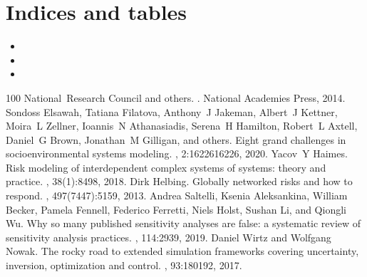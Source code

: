 \documentclass[letterpaper,10pt,english]{sphinxmanual}
\begin{document}
\chapter{Indices and tables}
\label{\detokenize{index:indices-and-tables}}\begin{itemize}
\item {} 
\sphinxAtStartPar
{}

\item {} 
\sphinxAtStartPar
{}

\item {} 
\sphinxAtStartPar
{}

\end{itemize}

\begin{sphinxthebibliography}{100}
\sphinxAtStartPar
National Research Council and others. . National Academies Press, 2014.
\sphinxAtStartPar
Sondoss Elsawah, Tatiana Filatova, Anthony J Jakeman, Albert J Kettner, Moira L Zellner, Ioannis N Athanasiadis, Serena H Hamilton, Robert L Axtell, Daniel G Brown, Jonathan M Gilligan, and others. Eight grand challenges in socio\sphinxhyphen{}environmental systems modeling. , 2:16226\textendash{}16226, 2020.
\sphinxAtStartPar
Yacov Y Haimes. Risk modeling of interdependent complex systems of systems: theory and practice. , 38(1):84\textendash{}98, 2018.
\sphinxAtStartPar
Dirk Helbing. Globally networked risks and how to respond. , 497(7447):51\textendash{}59, 2013.
\sphinxAtStartPar
Andrea Saltelli, Ksenia Aleksankina, William Becker, Pamela Fennell, Federico Ferretti, Niels Holst, Sushan Li, and Qiongli Wu. Why so many published sensitivity analyses are false: a systematic review of sensitivity analysis practices. , 114:29\textendash{}39, 2019.
\sphinxAtStartPar
Daniel Wirtz and Wolfgang Nowak. The rocky road to extended simulation frameworks covering uncertainty, inversion, optimization and control. , 93:180\textendash{}192, 2017.

\end{sphinxthebibliography}
\end{document}
